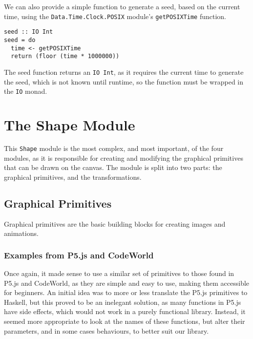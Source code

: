 \documentclass[../main.tex]{subfiles}
\begin{document}
            We can also provide a simple function to generate a seed, based on the current
                time, using the \verb|Data.Time.Clock.POSIX| module's \verb|getPOSIXTime|
                function.

            \begin{lstlisting}[label={lst:seed}, caption={The seed function.}]
seed :: IO Int
seed = do
  time <- getPOSIXTime
  return (floor (time * 1000000))\end{lstlisting}

            The seed function returns an \verb|IO Int|, as it requires the current time to
                generate the seed, which is not known until runtime, so the function must be
                wrapped in the \verb|IO| monad.

    \section{The Shape Module}
        This \verb|Shape| module is the most complex, and most important, of the four
            modules, as it is responsible for creating and modifying the graphical
            primitives that can be drawn on the canvas.
        The module is split into two parts: the graphical primitives, and the
            transformations.

        \subsection{Graphical Primitives}
            Graphical primitives are the basic building blocks for creating images and
                animations.

            \subsubsection{Examples from P5.js and CodeWorld}
                Once again, it made sense to use a similar set of primitives to those found in
                    P5.js and CodeWorld, as they are simple and easy to use, making them accessible
                    for beginners.
                An initial idea was to more or less translate the P5.js primitives to Haskell,
                    but this proved to be an inelegant solution, as many functions in P5.js have
                    side effects, which would not work in a purely functional library.
                Instead, it seemed more appropriate to look at the names of these functions,
                    but alter their parameters, and in some cases behaviours, to better suit our
                    library.
\end{document}
